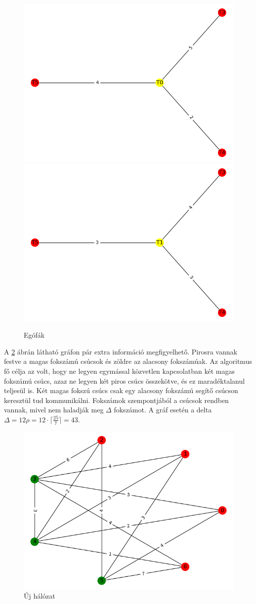 \documentclass[12pt]{report}
\begin{document}
\begin{figure}[h]
	\begin{center}
		\includegraphics[width=0.40\linewidth]{pictures/egotree1.png}
		\includegraphics[width=0.40\linewidth]{pictures/egotree2.png}
		\caption{Egófák}
		\label{ego-trees}
	\end{center}
\end{figure}

A \ref{routing-scheme} ábrán látható gráfon pár extra információ megfigyelhető. 
Pirosra vannak festve a magas fokszámú csúcsok és zöldre az alacsony fokszámúak.
Az algoritmus fő célja az volt, hogy ne legyen egymással közvetlen kapcsolatban két magas fokszámú csúcs, azaz ne legyen két piros csúcs összekötve, és ez maradéktalanul teljesül is.
Két magas fokszú csúcs csak egy alacsony fokszámú segítő csúcson keresztül tud kommunikálni.
Fokszámok szempontjából a csúcsok rendben vannak, mivel nem haladják meg $\Delta$ fokszámot. 
A gráf esetén a delta \(\Delta = 12\rho = 12 \cdot \lceil\frac{25}{7}\rceil = 43  \).

\begin{figure}[h]
	\begin{center}
		\includegraphics[width=0.49\linewidth]{pictures/new_network.png}
		\caption{Új hálózat}
		\label{routing-scheme}
	\end{center}
\end{figure}
\end{document}
